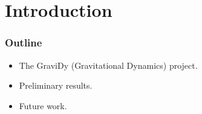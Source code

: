 \section{Introduction}

\begin{frame}
    \frametitle{Outline}
    \begin{itemize}
        \item The GraviDy (Gravitational Dynamics) project.
        \item Preliminary results.
        \item Future work.
    \end{itemize}
\end{frame}

%
%
